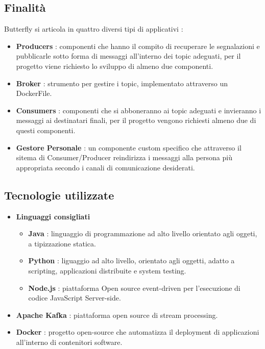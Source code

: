 \documentclass{article}
\begin{document}
        \subsection{Finalità}
            Butterfly si articola in quattro diversi tipi di applicativi :
            \begin{itemize}
                \item \textbf{Producers} : componenti che hanno il compito di recuperare le segnalazioni e pubblicarle sotto forma di messaggi all'interno dei topic adeguati, per il progetto viene richiesto lo sviluppo di almeno due componenti.
                \item \textbf{Broker} : strumento per gestire i topic, implementato attraverso un DockerFile.
                \item \textbf{Consumers} : componenti che si abboneranno ai topic adeguati e invieranno i messaggi ai destinatari finali, per il progetto vengono richiesti almeno due di questi componenti.
                \item \textbf{Gestore Personale} : un componente custom specifico che attraverso il sitema di Consumer/Producer reindirizza i messaggi alla persona più appropriata secondo i canali di comunicazione desiderati.
        \end{itemize}
        \subsection{Tecnologie utilizzate}
            \begin{itemize}
                \item \textbf{Linguaggi consigliati}
                    \begin{itemize}
                        \item \textbf{Java} : linguaggio di programmazione ad alto livello orientato agli oggeti, a tipizzazione statica.
                        \item \textbf{Python} : liguaggio ad alto livello, orientato agli oggetti, adatto a scripting, applicazioni distribuite e system testing.
                        \item \textbf{Node.js} : piattaforma Open source event-driven per l'esecuzione di codice JavaScript Server-side.
                    \end{itemize}	
            \item \textbf{Apache Kafka} : piattaforma open source di stream processing.
            \item \textbf{Docker} : progetto open-source che automatizza il deployment di applicazioni all'interno di contenitori software.
            \end{itemize}
\end{document}
